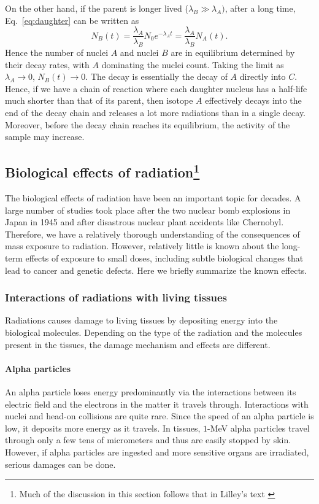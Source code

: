 \documentclass[nofootinbib,preprint,aps]{revtex4-1}
\begin{document}
        On the other hand, if the parent is longer lived
        ($\lambda_B \gg \lambda_A)$, after a long time, Eq.~\ref{eq:daughter} can be written as
        \begin{equation}
            N_B(t)=\frac{\lambda_A}{\lambda_B}N_0 e^{-\lambda_A t}=\frac{\lambda_A}{\lambda_B}N_A(t).
        \end{equation}
        Hence the number of nuclei $A$ and nuclei $B$ are in equilibrium determined by their decay rates, with
        $A$ dominating the nuclei count. Taking the limit as $\lambda_A \rightarrow 0$, $N_B(t)\rightarrow 0$.
        The decay is essentially the decay of $A$ directly into $C$. Hence, if we have a chain of reaction
        where each daughter nucleus has a half-life much shorter than that of its parent, then 
        isotope $A$ effectively decays into the end of the decay chain and releases a lot more radiations than
        in a single decay. Moreover, before the decay chain reaches its equilibrium, the activity of the sample
        may increase.

        \subsection{Biological effects of radiation\footnote{Much of the discussion in this section follows that in
        Lilley's text \cite[chapt. 7]{l01}}}
        The biological effects of radiation have been an important topic for decades. A large
        number of studies took place after the two nuclear bomb explosions in Japan in 1945
        and after disastrous nuclear plant accidents like Chernobyl. Therefore, we have a relatively
        thorough understanding of the consequences of mass exposure to radiation. However, relatively
        little is known about the long-term effects of exposure to small doses, including subtle biological
        changes that lead to cancer and genetic defects. Here we briefly summarize the known effects.
        \subsubsection{Interactions of radiations with living tissues}
        \label{sec:interactions}
        Radiations causes damage to living tissues by depositing energy into the biological molecules.
        Depending on the type of the radiation
        and the molecules present in the tissues, the damage mechanism and effects are different.
        \paragraph{Alpha particles} An alpha particle loses energy predominantly via the interactions between its electric
        field and the electrons in the matter it travels through. Interactions with nuclei and head-on collisions
        are quite rare. Since the speed of an alpha particle is low, it deposits more energy as it
        travels. In tissues, $1$-MeV alpha particles travel through only a few tens of micrometers and thus
        are easily stopped by skin. However, if alpha particles are ingested and more sensitive organs are irradiated,
        serious damages can be done.
\end{document}
